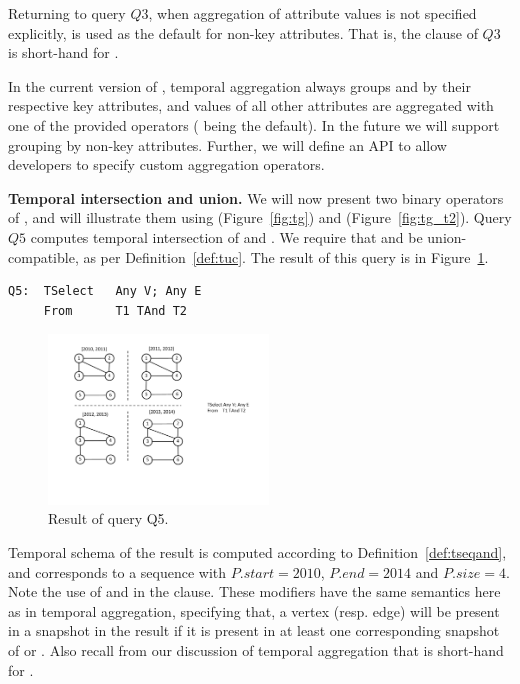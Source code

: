 Returning to query $Q3$, when aggregation of attribute values is not
specified explicitly,  is used as the default for non-key
attributes.  That is, the  clause of $Q3$ is short-hand
for  
.

In the current version of \ql, temporal aggregation always groups
 and  by their respective key attributes, and values
of all other attributes are aggregated with one of the provided
operators ( being the default).  In the future we will
support grouping by non-key attributes.  Further, we will define an
API to allow developers to specify custom aggregation operators.

{\bf Temporal intersection and union.} We will now present two binary
operators of \ql, and will illustrate them using 
(Figure~\ref{fig:tg}) and  (Figure~\ref{fig:tg_t2}).  Query
$Q5$ computes temporal intersection of  and .  We
require that  and  be union-compatible, as per
Definition~\ref{def:tuc}.  The result of this query is in
Figure~\ref{fig:q5}.

\begin{verbatim}
Q5:  TSelect   Any V; Any E
     From      T1 TAnd T2
\end{verbatim}

\begin{figure}
\centering
\includegraphics[width=2.3in]{figs/q5.pdf}
\caption{Result of query Q5.}
\label{fig:q5}
\end{figure}

Temporal schema of the result is computed according to
Definition~\ref{def:tseqand}, and corresponds to a sequence with
$P.start = 2010$, $P.end=2014$ and $P.size=4$.  Note the use of
 and  in the  clause.  These
modifiers have the same semantics here as in temporal aggregation,
specifying that, a vertex (resp. edge) will be present in a snapshot
in the result if it is present in at least one corresponding snapshot
of  or .  Also recall from our discussion of
temporal aggregation that  is short-hand
for .

